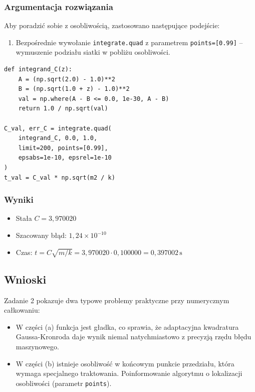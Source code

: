 \documentclass[12pt, a4paper]{article}
\begin{document}
\subsubsection{Argumentacja rozwiązania}

Aby poradzić sobie z osobliwością, zastosowano następujące podejście:
\begin{enumerate}
  \item Bezpośrednie wywołanie \texttt{integrate.quad} z parametrem \texttt{points=[0.99]} -- wymuszenie podziału siatki w pobliżu osobliwości.
\end{enumerate}

\begin{lstlisting}[caption={Obliczenie stałej C z obsługą osobliwości}]
def integrand_C(z):
    A = (np.sqrt(2.0) - 1.0)**2
    B = (np.sqrt(1.0 + z) - 1.0)**2
    val = np.where(A - B <= 0.0, 1e-30, A - B)
    return 1.0 / np.sqrt(val)

C_val, err_C = integrate.quad(
    integrand_C, 0.0, 1.0,
    limit=200, points=[0.99],
    epsabs=1e-10, epsrel=1e-10
)
t_val = C_val * np.sqrt(m2 / k)
\end{lstlisting}

\subsubsection{Wyniki}

\begin{itemize}
  \item Stała $C = 3{,}970020$
  \item Szacowany błąd: $1{,}24 \times 10^{-10}$
  \item Czas: $t = C\sqrt{m/k} = 3{,}970020 \cdot 0{,}100000 = 0{,}397002\,\text{s}$
\end{itemize}

\subsection{Wnioski}

Zadanie 2 pokazuje dwa typowe problemy praktyczne przy numerycznym całkowaniu:
\begin{itemize}
  \item W części (a) funkcja jest gładka, co sprawia, że adaptacyjna kwadratura Gaussa-Kronroda daje wynik niemal natychmiastowo z precyzją rzędu błędu maszynowego.
  \item W części (b) istnieje osobliwość w końcowym punkcie przedziału, która wymaga specjalnego traktowania. Poinformowanie algorytmu o lokalizacji osobliwości (parametr \texttt{points}).
\end{itemize}
\end{document}

